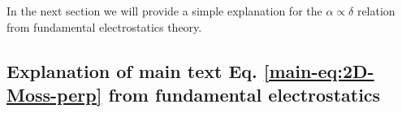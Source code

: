\documentclass[journal=ancac3,email=true,hyperref=true,keywords=false]{achemso}
\begin{document}
In the next section we will
provide a simple explanation for the $\alpha \propto \delta$ relation
from fundamental electrostatics theory.

\subsection{Explanation of main text Eq. \ref{main-eq:2D-Moss-perp}
  from fundamental electrostatics}
\label{ssec:theory-1-perp-fundamental}
\end{document}
